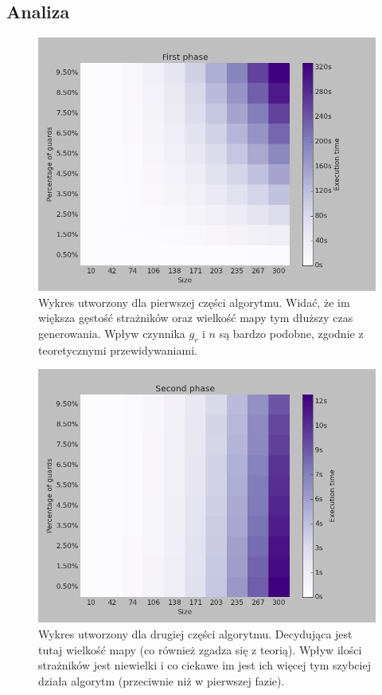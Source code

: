 \documentclass[12pt]{article}
\begin{document}
\subsection{Analiza}
\begin{figure}[H]
\includegraphics[width=\textwidth,keepaspectratio=true]{Thief/creations.png}
\caption{
Wykres utworzony dla pierwszej części algorytmu. Widać, że im większa gęstość strażników oraz wielkość mapy tym dłuższy czas generowania. Wpływ czynnika $g_r$ i $n$ są bardzo podobne, zgodnie z teoretycznymi przewidywaniami.}
\end{figure}	
\begin{figure}[H]
\includegraphics[width=\textwidth,keepaspectratio=true]{Thief/going.png}
\caption{
Wykres utworzony dla drugiej części algorytmu. Decydująca jest tutaj wielkość mapy (co również zgadza się z teorią). Wpływ ilości strażników jest niewielki i co ciekawe im jest ich więcej tym szybciej działa algorytm (przeciwnie niż w pierwszej fazie).
}
\end{figure}	
\end{document}
